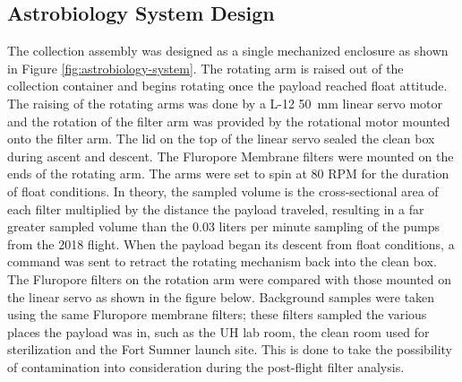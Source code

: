 \subsection{Astrobiology System Design}
\label{sec:Astrobiology-Design}

The collection assembly was designed as a single mechanized enclosure as shown in Figure \ref{fig:astrobiology-system}.  The rotating arm is raised out of the collection container and begins rotating once the payload reached float attitude. The raising of the rotating arms was done by a L-12 \SI{50}{\milli\meter} linear servo motor and  the rotation of the filter arm was provided by the rotational motor mounted onto the filter arm.  The lid on the top of the linear servo sealed the clean box during ascent and descent.  The Fluropore Membrane filters were mounted on the ends of the rotating arm.  The arms were set to spin at 80 RPM for the duration of float conditions.  In theory, the sampled volume is the cross-sectional area of each filter multiplied by the distance the payload traveled, resulting in a far greater sampled volume than the 0.03 liters per minute sampling of the pumps from the 2018 flight. When the payload began its descent from float conditions, a command was sent to retract the rotating mechanism back into the clean box.  The Fluropore filters on the rotation arm were compared with those mounted on the linear servo as shown in the figure below.  Background samples were taken using the same Fluropore membrane filters; these filters sampled the various places the payload was in, such as the UH lab room, the clean room used for sterilization and the Fort Sumner launch site. This is done to take the possibility of contamination into consideration during the post-flight filter analysis.

